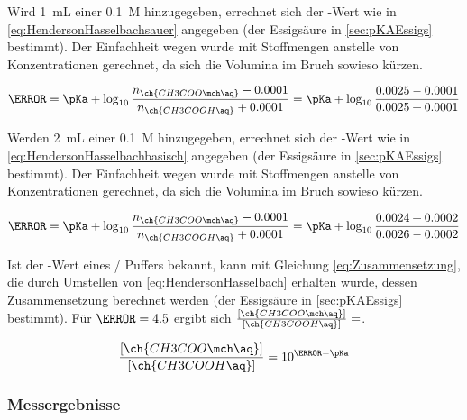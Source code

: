 \documentclass{article}
\begin{document}
      Wird \SI[mode=text]{1}{\milli\liter} einer \SI[mode=text]{0.1}{M}  hinzugegeben, errechnet sich der \pH-Wert wie in \eqref{eq:HendersonHasselbachsauer} angegeben (\pKa der Essigsäure in \ref{sec:pKAEssigs} bestimmt). Der Einfachheit wegen wurde mit Stoffmengen anstelle von Konzentrationen gerechnet, da sich die Volumina im Bruch sowieso kürzen.
      
      \begin{equation}
        \pH = \pKa + \log _{10} \frac{n_{\ch{CH3COO\mch\aq}} - 0.0001}{n_{\ch{CH3COOH\aq}} + 0.0001} = \pKa + \log _{10} \frac{0.0025 - 0.0001}{0.0025 + 0.0001} \label{eq:HendersonHasselbachsauer}
      \end{equation}
      
      Werden \SI[mode=text]{2}{\milli\liter} einer \SI[mode=text]{0.1}{M}  hinzugegeben, errechnet sich der \pH-Wert wie in \eqref{eq:HendersonHasselbachbasisch} angegeben (\pKa der Essigsäure in \ref{sec:pKAEssigs} bestimmt). Der Einfachheit wegen wurde mit Stoffmengen anstelle von Konzentrationen gerechnet, da sich die Volumina im Bruch sowieso kürzen.
      
      \begin{equation}
        \pH = \pKa + \log _{10} \frac{n_{\ch{CH3COO\mch\aq}} - 0.0001}{n_{\ch{CH3COOH\aq}} + 0.0001} = \pKa + \log _{10} \frac{0.0024 + 0.0002}{0.0026 - 0.0002} \label{eq:HendersonHasselbachbasisch}
      \end{equation}
      
      Ist der \pH-Wert eines / Puffers bekannt, kann mit Gleichung \eqref{eq:Zusammensetzung}, die durch Umstellen von \eqref{eq:HendersonHasselbach} erhalten wurde, dessen Zusammensetzung berechnet werden (\pKa der Essigsäure in \ref{sec:pKAEssigs} bestimmt). Für $\pH=4.5$ ergibt sich $\frac{[\ch{CH3COO\mch\aq}]}{[\ch{CH3COOH\aq}]} = $.
      
      \begin{equation}
        \frac{[\ch{CH3COO\mch\aq}]}{[\ch{CH3COOH\aq}]} = 10^{\pH - \pKa} \label{eq:Zusammensetzung}
      \end{equation}
      
      \subsubsection{Messergebnisse} \label{sec:MessergebnissePuffer}
        
\end{document}
